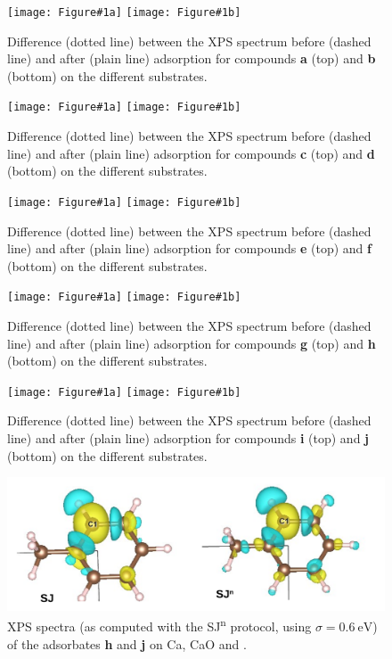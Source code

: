 \documentclass[journal=jpccck,manuscript=article]{achemso}
\begin{document}
\newcommand{\XPSsa}[3]{
\begin{figure}[!h]
	\centering
	\texttt{[image: Figure\#1a]}
	\texttt{[image: Figure\#1b]}
	\caption{Difference (dotted line) between the XPS spectrum before (dashed line) and after (plain line) adsorption for compounds \textbf{#2} (top) and \textbf{#3} (bottom) on the different substrates. }
	\label{fig:spectraXPSads#2#3}
\end{figure}
}

\XPSsa{S5}{a}{b}
\XPSsa{S6}{c}{d}
\XPSsa{S7}{e}{f}
\XPSsa{S8}{g}{h}
\XPSsa{S9}{i}{j}

\begin{figure}[!h]
	\centering
	\includegraphics[width=.8\linewidth]{FigureS10}
	\caption{XPS spectra (as computed with the SJ\textsuperscript{n} protocol, using $\sigma=\SI{0.6}{\electronvolt}$) of the adsorbates \textbf{h} and \textbf{j} on Ca, CaO and .}
	\label{fig:possSJn}
\end{figure}

\clearpage

	
\end{document}
